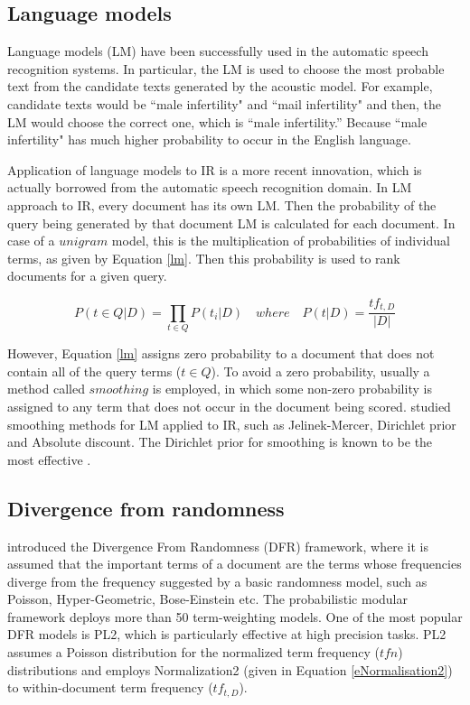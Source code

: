 \subsection{Language models}

Language models (LM) have been successfully used in the automatic speech recognition systems.
In particular, the LM is used to choose the most probable text from the candidate texts generated by the acoustic model.
For example, candidate texts would be ``male infertility" and ``mail infertility" and then, the LM would choose the correct one, which is ``male infertility.''
Because ``male infertility" has much higher probability to occur in the English language.

Application of language models to IR \citep{Ponte98,hiemstraPhD,lm} is a more recent innovation, which is actually borrowed from the automatic speech recognition domain.
In LM approach to IR, every document has its own LM. Then the probability of the query being generated by that document LM is calculated for each document.
In case of a $unigram$ model, this is the multiplication of probabilities of individual terms, as given by Equation \ref{lm}.
Then this probability is used to rank documents for a given query.

\begin{equation}\label{lm}
P(t \in Q \vert D) = \prod_{t \in Q} P(t_i \vert D) \quad where \quad P(t \vert D) = \frac{tf_{t,D}}{|D|}
\end{equation}

However, Equation \ref{lm} assigns zero probability to a document that does not contain all of the query terms ($t \in Q$).
To avoid a zero probability, usually a method called $smoothing$ is employed, in which some non-zero probability is assigned to any term that does not occur in the document being scored.
\citet{jelinek} studied smoothing methods for LM applied to IR, such as Jelinek-Mercer, Dirichlet prior and Absolute discount.
The Dirichlet prior for smoothing is known to be the most effective \citep{irPractice}.

\subsection{Divergence from randomness}

\citet*{dfr} introduced the Divergence From Randomness (DFR) framework, where it is assumed that the important terms of a document are the terms whose frequencies diverge from the frequency suggested by a basic randomness model, such as Poisson, Hyper-Geometric, Bose-Einstein etc.
The probabilistic modular framework deploys more than 50 term-weighting models.
One of the most popular DFR models is PL2, which is particularly effective at high precision tasks.
PL2 assumes a Poisson distribution for the normalized term frequency ($tfn$) distributions and employs Normalization2 (given in Equation \ref{eNormalisation2}) to within-document term frequency ($tf_{t,D}$).

